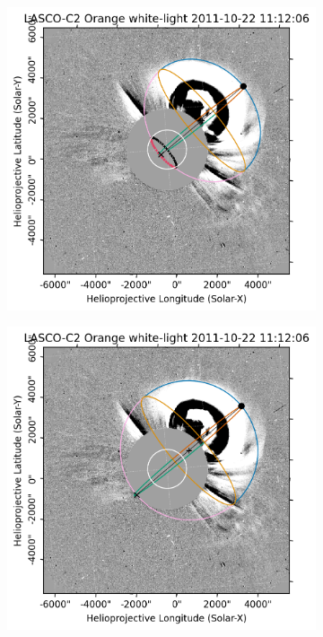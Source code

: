 \begin{figure}[!htp]
	\centering
	\begin{subfigure}[b]{0.3\textwidth}
		\includegraphics[width=\textwidth]{chapter2/figs/Fig_s1.png}
	\end{subfigure}
	\hfill
	\begin{subfigure}[b]{0.3\textwidth}
		\includegraphics[width=\textwidth]{chapter2/figs/Fig_e1.png}

\end{subfigure}
\end{figure}
